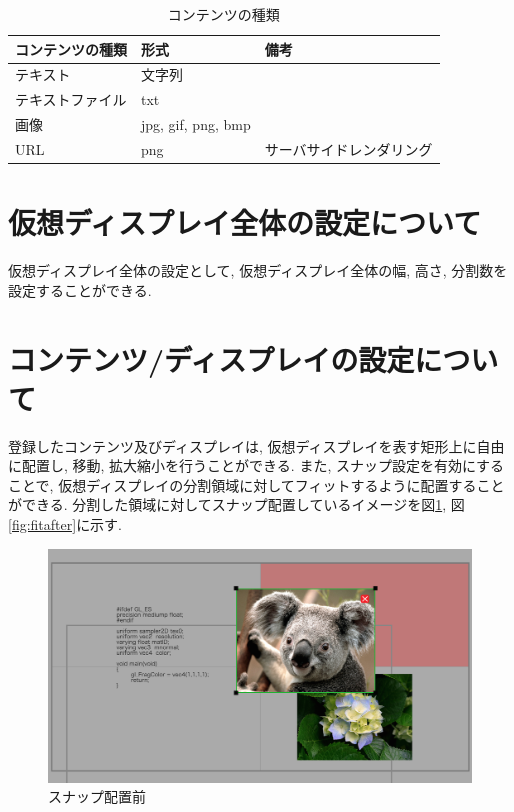 \documentclass[a4paper,10pt,oneside]{jsbook}
\begin{document}
\begin{table}[htbp]
\begin{center}
\caption{コンテンツの種類}
\label{contentstype}
\begin{tabular}{|l|l|l|}
\hline
コンテンツの種類 & 形式 & 備考 \\
\hline
\hline
テキスト & 文字列 & \\
\hline
テキストファイル & txt & \\
\hline
画像	& jpg, gif, png, bmp & \\
\hline
URL	& png & サーバサイドレンダリング \\
\hline

\end{tabular}
\end{center}
\end{table}

\section{仮想ディスプレイ全体の設定について}
仮想ディスプレイ全体の設定として, 仮想ディスプレイ全体の幅, 高さ, 分割数を設定することができる. 

\section{コンテンツ/ディスプレイの設定について}
登録したコンテンツ及びディスプレイは, 仮想ディスプレイを表す矩形上に自由に配置し, 移動, 拡大縮小を行うことができる. また, スナップ設定を有効にすることで, 仮想ディスプレイの分割領域に対してフィットするように配置することができる.
分割した領域に対してスナップ配置しているイメージを図\ref{fig:fitbefore}, 図\ref{fig:fitafter}に示す. 


\begin{figure}[htbp]
	\begin{center}
		\includegraphics[width=11.5cm]{image/fitbefore.png}
	\end{center}
	\caption{スナップ配置前}
	\label{fig:fitbefore}
\end{figure}
\end{document}
